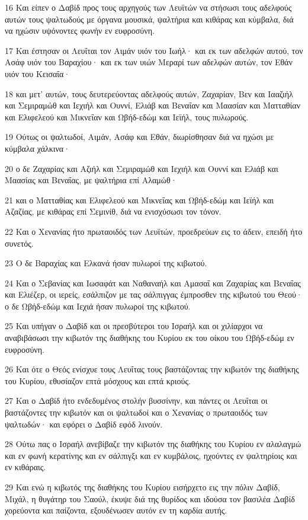 \par 16 Και είπεν ο Δαβίδ προς τους αρχηγούς των Λευϊτών να στήσωσι τους αδελφούς αυτών τους ψαλτωδούς με όργανα μουσικά, ψαλτήρια και κιθάρας και κύμβαλα, διά να ηχώσιν υψόνοντες φωνήν εν ευφροσύνη.
\par 17 Και έστησαν οι Λευΐται τον Αιμάν υιόν του Ιωήλ· και εκ των αδελφών αυτού, τον Ασάφ υιόν του Βαραχίου· και εκ των υιών Μεραρί των αδελφών αυτών, τον Εθάν υιόν του Κεισαΐα·
\par 18 και μετ' αυτών, τους δευτερεύοντας αδελφούς αυτών, Ζαχαρίαν, Βεν και Ιααζιήλ και Σεμιραμώθ και Ιεχιήλ και Ουννί, Ελιάβ και Βεναΐαν και Μαασίαν και Ματταθίαν και Ελιφελεού και Μικνεΐαν και Ωβήδ-εδώμ και Ιεϊήλ, τους πυλωρούς.
\par 19 Ούτως οι ψαλτωδοί, Αιμάν, Ασάφ και Εθάν, διωρίσθησαν διά να ηχώσι με κύμβαλα χάλκινα·
\par 20 ο δε Ζαχαρίας και Αζιήλ και Σεμιραμώθ και Ιεχιήλ και Ουννί και Ελιάβ και Μαασίας και Βεναΐας, με ψαλτήρια επί Αλαμώθ·
\par 21 και ο Ματταθίας και Ελιφελεού και Μικνεΐας και Ωβήδ-εδώμ και Ιεϊήλ και Αζαζίας, με κιθάρας επί Σεμινίθ, διά να ενισχύσωσι τον τόνον.
\par 22 Και ο Χενανίας ήτο πρωταοιδός των Λευϊτών, προεδρεύων εις το άδειν, επειδή ήτο συνετός.
\par 23 Ο δε Βαραχίας και Ελκανά ήσαν πυλωροί της κιβωτού.
\par 24 Και ο Σεβανίας και Ιωσαφάτ και Ναθαναήλ και Αμασαΐ και Ζαχαρίας και Βεναΐας και Ελιέζερ, οι ιερείς, εσάλπιζον με τας σάλπιγγας έμπροσθεν της κιβωτού του Θεού· ο δε Ωβήδ-εδώμ και Ιεχιά ήσαν πυλωροί της κιβωτού.
\par 25 Και υπήγαν ο Δαβίδ και οι πρεσβύτεροι του Ισραήλ και οι χιλίαρχοι να αναβιβάσωσι την κιβωτόν της διαθήκης του Κυρίου εκ του οίκου του Ωβήδ-εδώμ εν ευφροσύνη.
\par 26 Και ότε ο Θεός ενίσχυε τους Λευΐτας τους βαστάζοντας την κιβωτόν της διαθήκης του Κυρίου, εθυσίαζον επτά μόσχους και επτά κριούς.
\par 27 Και ο Δαβίδ ήτο ενδεδυμένος στολήν βυσσίνην, και πάντες οι Λευΐται οι βαστάζοντες την κιβωτόν και οι ψαλτωδοί και ο Χενανίας ο πρωταοιδός των ψαλτωδών· και εφόρει ο Δαβίδ εφόδ λινούν.
\par 28 Ούτω πας ο Ισραήλ ανεβίβαζε την κιβωτόν της διαθήκης του Κυρίου εν αλαλαγμώ και εν φωνή κερατίνης και εν σάλπιγξι και εν κυμβάλοις, ηχούντες εν ψαλτηρίοις και εν κιθάραις.
\par 29 Και ενώ η κιβωτός της διαθήκης του Κυρίου εισήρχετο εις την πόλιν Δαβίδ, Μιχάλ, η θυγάτηρ του Σαούλ, έκυψε διά της θυρίδος και ιδούσα τον βασιλέα Δαβίδ χορεύοντα και παίζοντα, εξουδένωσεν αυτόν εν τη καρδία αυτής.

